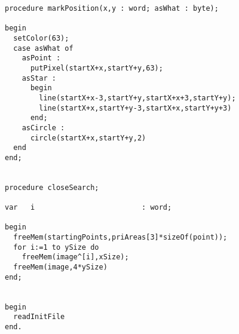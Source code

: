 \begin{verbatim}
procedure markPosition(x,y : word; asWhat : byte);

begin
  setColor(63);
  case asWhat of
    asPoint :
      putPixel(startX+x,startY+y,63);
    asStar :
      begin
        line(startX+x-3,startY+y,startX+x+3,startY+y);
        line(startX+x,startY+y-3,startX+x,startY+y+3)
      end;
    asCircle :
      circle(startX+x,startY+y,2)
  end
end;


procedure closeSearch;

var   i                         : word;

begin
  freeMem(startingPoints,priAreas[3]*sizeOf(point));
  for i:=1 to ySize do
    freeMem(image^[i],xSize);
  freeMem(image,4*ySize)
end;


begin
  readInitFile
end.
\end{verbatim}
